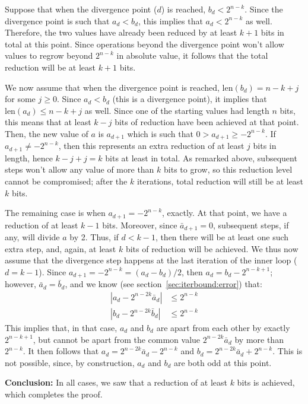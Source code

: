 \documentclass{llncs}
\newcommand{\bitlength}{\text{len}}
\begin{document}
Suppose that when the divergence point ($d$) is reached,
$b_d < 2^{n-k}$. Since the divergence point is such that $a_d < b_d$,
this implies that $a_d < 2^{n-k}$ as well. Therefore, the two values
have already been reduced by at least $k+1$ bits in total at this
point. Since operations beyond the divergence point won't allow values
to regrow beyond $2^{n-k}$ in absolute value, it follows that the
total reduction will be at least $k+1$ bits.

We now assume that when the divergence point is reached,
$\bitlength(b_d) = n - k + j$ for some $j\geq 0$. Since $a_d < b_d$
(this is a divergence point), it implies that $\bitlength(a_d) \leq n -
k + j$ as well. Since one of the starting values had length $n$ bits,
this means that at least $k - j$ bits of reduction have been achieved at
that point. Then, the new value of $a$ is $a_{d+1}$ which is such that
$0 > a_{d+1} \geq -2^{n-k}$. If $a_{d+1} \neq -2^{n-k}$, then this
represents an extra reduction of at least $j$ bits in length, hence $k -
j + j = k$ bits at least in total. As remarked above, subsequent steps
won't allow any value of more than $k$ bits to grow, so this reduction
level cannot be compromised; after the $k$ iterations, total reduction
will still be at least $k$ bits.

The remaining case is when $a_{d+1} = -2^{n-k}$, exactly. At that
point, we have a reduction of at least $k - 1$ bits. Moreover, since
$\bar a_{d+1} = 0$, subsequent steps, if any, will divide $a$ by 2.
Thus, if $d < k - 1$, then there will be at least one such extra step,
and, again, at least $k$ bits of reduction will be achieved. We thus
now assume that the divergence step happens at the last iteration of
the inner loop ($d = k - 1$). Since $a_{d+1} = -2^{n-k} = (a_d - b_d)/2$,
then $a_d = b_d - 2^{n-k+1}$; however, $\bar a_d = \bar b_d$, and
we know (see section~\ref{sec:iterbound:error}) that:
\begin{align*}
    |a_d - 2^{n-2k}\bar a_d| &\leq 2^{n-k} \\
    |b_d - 2^{n-2k}\bar b_d| &\leq 2^{n-k}
\end{align*}
This implies that, in that case, $a_d$ and $b_d$ are apart from each
other by exactly $2^{n-k+1}$, but cannot be apart from the common
value $2^{n-2k}\bar a_d$ by more than $2^{n-k}$. It then follows
that $a_d = 2^{n-2k}\bar a_d - 2^{n-k}$ and
$b_d = 2^{n-2k}\bar a_d + 2^{n-k}$. This is not possible, since, by
construction, $a_d$ and $b_d$ are both odd at this point.

\vspace{2ex}
\noindent\textsf{\textbf{Conclusion:}} In all cases, we saw that
a reduction of at least $k$ bits is achieved, which completes the proof.
\end{document}
